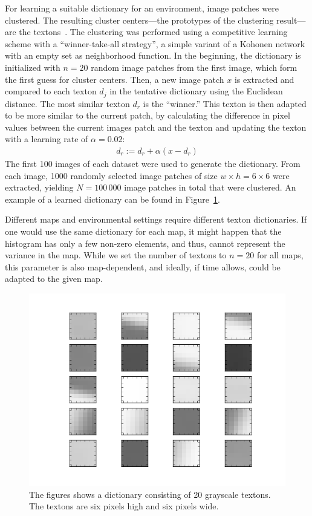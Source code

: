 \documentclass{report}
\begin{document}
For learning a suitable dictionary for an environment, image patches
were clustered. The resulting cluster centers---the prototypes of the
clustering result---are the textons~\cite{varma2003texture}. The
clustering was performed using a competitive learning scheme with a
``winner-take-all strategy'', a simple variant of a Kohonen
network~\cite{kohonen1990self} with an empty set as neighborhood
function. In the beginning, the dictionary is initialized with
$n = 20$ random image patches from the first image, which form the
first guess for cluster centers. Then, a new image patch $x$ is
extracted and compared to each texton $d_j$ in the tentative
dictionary using the Euclidean distance. The most similar texton $d_r$
is the ``winner.'' This texton is then adapted to be more similar to
the current patch, by calculating the difference in pixel values
between the current images patch and the texton and updating the
texton with a learning rate of $\alpha = 0.02$:
\begin{align}
  d_r := d_r + \alpha (x - d_r)
\end{align}
The first 100 images of each dataset were used to generate the
dictionary. From each image, 1000 randomly selected image patches of
size $w \times h = 6 \times 6$ were extracted, yielding $N = 100\,000$
image patches in total that were clustered. An example of a learned
dictionary can be found in Figure~\ref{fig:dictionary}.

Different maps and environmental settings require different texton
dictionaries. If one would use the same dictionary for each map, it
might happen that the histogram has only a few non-zero elements, and
thus, cannot represent the variance in the map. While we set the
number of textons to $n = 20$ for all maps, this parameter is also
map-dependent, and ideally, if time allows, could be adapted to the
given map.

\begin{figure}[h!]
\begin{center}
\includegraphics[width=0.7\columnwidth]{dict}
\caption{{\label{fig:dictionary} The figures shows a dictionary
    consisting of 20 grayscale textons. The textons are six pixels
    high and six pixels wide.%
  }}
\end{center}
\end{figure}
\end{document}

